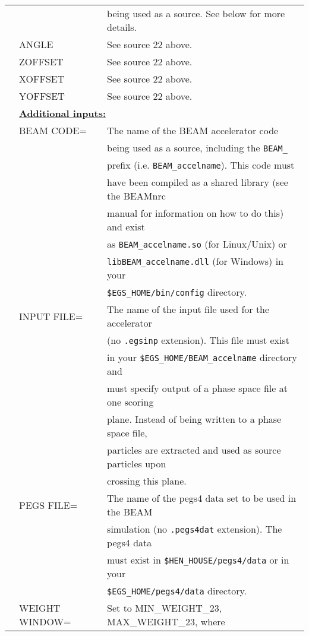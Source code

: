 \begin{longtable}{lll}
  &      & being used as a source.  See below for more details.\\ 
  & ANGLE & See source 22 above.\\
  & ZOFFSET & See source 22 above.\\
  & XOFFSET & See source 22 above.\\
  & YOFFSET & See source 22 above.\\
& \multicolumn{2}{l}{\bf \underline {Additional inputs:}}\\
  & BEAM CODE= & The name of the BEAM accelerator code\\
  &            & being used as a source, including the {\tt BEAM\_}\\
  &            & prefix (i.e. {\tt BEAM\_accelname}).  This code must\\
  &            & have been compiled as a shared library (see the BEAMnrc\\
  &            & manual for information on how to do this) and exist\\
  &            & as {\tt BEAM\_accelname.so} (for Linux/Unix) or\\
  &            & {\tt libBEAM\_accelname.dll} (for Windows) in your\\
  &            & {\tt \$EGS\_HOME/bin/config} directory.\\ 
  & INPUT FILE= & The name of the input file used for the accelerator\\
  &             & (no {\tt .egsinp} extension).  This file must exist\\
  &             & in your {\tt \$EGS\_HOME/BEAM\_accelname} directory and\\
  &             & must specify output of a phase space file at one scoring\\
  &             & plane.  Instead of being written to a phase space file,\\
  &             & particles are extracted and used as source particles upon\\
  &             & crossing this plane.\\
  & PEGS FILE= & The name of the pegs4 data set to be used in the BEAM\\
  &            & simulation (no {\tt .pegs4dat} extension).  The pegs4 data\\
  &            & must exist in {\tt \$HEN\_HOUSE/pegs4/data} or in your\\
  &            & {\tt \$EGS\_HOME/pegs4/data} directory.\\
  & WEIGHT WINDOW= & Set to MIN\_WEIGHT\_23, MAX\_WEIGHT\_23, where\\

\end{longtable}
